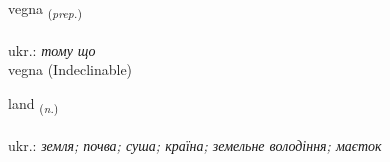 \documentclass[frontgrid, backgrid]{flacards}\usepackage[]{graphicx}\usepackage[]{xcolor}
\begin{document}
\renewcommand{\blhead}{\vskip5pt {\small\bfseries\footnotesize Forsetning | прийменник }}
\renewcommand{\bcfoot}{\vskip5pt \hspace{2pt}{\small\bfseries\footnotesize 1K}}


{vegna \small{\textsubscript{(\textit{prep.})}} \\[1ex]
\textphonetic{[vɛkna]} \\
ukr.: \emph{тому що} \\  [2ex]
vegna (Indeclinable)}

\renewcommand{\flhead}{\vskip5pt \fboxsep=0pt {\small\bfseries\footnotesize Nafnorð | іменник}}
\renewcommand{\fcfoot}{\vskip5pt \fboxsep=0pt \hspace{2pt}{\small\bfseries\footnotesize 1K}}

\renewcommand{\blhead}{\vskip5pt {\small\bfseries\footnotesize Nafnorð | іменник }}
\renewcommand{\bcfoot}{\vskip5pt \hspace{2pt}{\small\bfseries\footnotesize 1K}}


{land \small{\textsubscript{(\textit{n.})}} \\[1ex] %
\textphonetic{[lant]} \\
ukr.: \emph{земля; почва; суша; країна; земельне володіння; маєток} \\  [2ex]
\renewcommand*{\arraystretch}{0.8}
}


\renewcommand{\flhead}{\vskip5pt \fboxsep=0pt {\small\bfseries\footnotesize Atviksorð | прислівник}}
\renewcommand{\fcfoot}{\vskip5pt \fboxsep=0pt \hspace{2pt}{\small\bfseries\footnotesize 1K}}

\renewcommand{\blhead}{\vskip5pt {\small\bfseries\footnotesize Atviksorð | прислівник }}
\renewcommand{\bcfoot}{\vskip5pt \hspace{2pt}{\small\bfseries\footnotesize 1K}}
\end{document}
